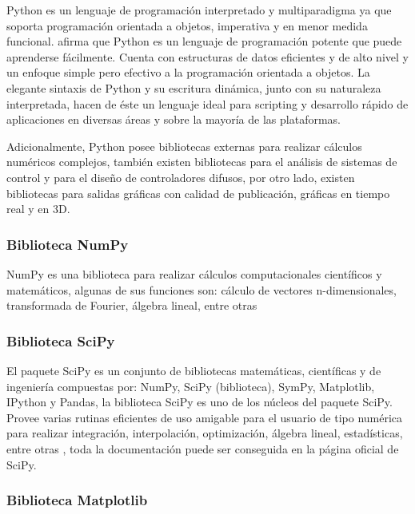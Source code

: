         Python es un lenguaje de programación interpretado y multiparadigma ya que soporta programación orientada a objetos, imperativa y en menor medida funcional. \textcite{guido2017tutorial} afirma que Python es un lenguaje de programación potente que puede aprenderse fácilmente. Cuenta con estructuras de datos eficientes y de alto
        nivel y un enfoque simple pero efectivo a la programación orientada a objetos. La elegante sintaxis de Python y su escritura
        dinámica, junto con su naturaleza interpretada, hacen de éste un lenguaje ideal para scripting y desarrollo rápido de
        aplicaciones en diversas áreas y sobre la mayoría de las plataformas.
        
        Adicionalmente, Python posee bibliotecas externas para realizar cálculos numéricos complejos, también existen bibliotecas para el análisis de sistemas de control y para el diseño de controladores difusos, por otro lado, existen bibliotecas para salidas gráficas con calidad de publicación, gráficas en tiempo real y en 3D.
        
        \subsubsection{Biblioteca NumPy}

            NumPy es una biblioteca para realizar cálculos computacionales científicos y matemáticos, algunas de sus funciones son: cálculo de vectores n-dimensionales, transformada de Fourier, álgebra lineal, entre otras \Parencite{numpy}

        \subsubsection{Biblioteca SciPy}	

            El paquete SciPy es un conjunto de bibliotecas matemáticas, científicas y de ingeniería compuestas por: NumPy, SciPy (biblioteca), SymPy, Matplotlib, IPython y Pandas, la biblioteca SciPy es uno de los núcleos del paquete SciPy. Provee varias rutinas eficientes de uso amigable para el usuario de tipo numérica para realizar integración, interpolación, optimización, álgebra lineal, estadísticas, entre otras \Parencite{scipy}, toda la documentación puede ser conseguida en la página oficial de SciPy.
            
        \subsubsection{Biblioteca Matplotlib}

